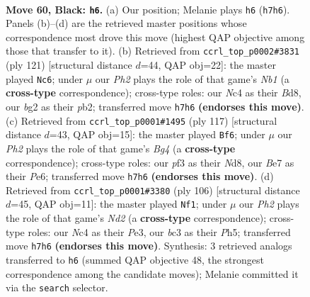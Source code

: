 \documentclass[11pt]{article}
\begin{document}
\clearpage

\begin{figure}[p]\centering
\begin{subfigure}{0.46\textwidth}\centering
\resizebox{\linewidth}{!}{%
\newchessgame
\chessboard[
  setfen={3r4/4b2p/p2p2k1/4p2p/2n1P3/2B2P2/4K1B1/7R b - - 1 60},
  showmover=false,
  pgfstyle=straightmove, color=movearrow, markmove={h7-h6}
]}
\caption{}
\end{subfigure}\hfill
\begin{subfigure}{0.46\textwidth}\centering
\resizebox{\linewidth}{!}{%
\newchessgame
\chessboard[
  setfen={1n1b4/p2r1kp1/5pp1/8/2N3PP/2B5/1P2KP2/R7 b - - 20 61},
  showmover=false,
  pgfstyle=straightmove, color=movearrow, markmove={b8-c6}
]}
\caption{}
\end{subfigure}
\\[4pt]
\begin{subfigure}{0.46\textwidth}\centering
\resizebox{\linewidth}{!}{%
\newchessgame
\chessboard[
  setfen={2kn4/1p5R/4p1r1/1p3pb1/1P1P4/P4B2/1B3P2/5K2 b - - 2 59},
  showmover=false,
  pgfstyle=straightmove, color=movearrow, markmove={g5-f6}
]}
\caption{}
\end{subfigure}\hfill
\begin{subfigure}{0.46\textwidth}\centering
\resizebox{\linewidth}{!}{%
\newchessgame
\chessboard[
  setfen={1r3k2/2b2pp1/7p/7P/6P1/1P2P3/2BN1PK1/8 w - - 3 54},
  showmover=false,
  pgfstyle=straightmove, color=movearrow, markmove={d2-f1}
]}
\caption{}
\end{subfigure}
\caption{\textbf{Move 60, Black: \texttt{h6}.} (a) Our position; Melanie plays \texttt{h6} (\texttt{h7h6}). Panels (b)--(d) are the retrieved master positions whose correspondence most drove this move (highest QAP objective among those that transfer to it). (b) Retrieved from \texttt{ccrl\_top\_p0002\#3831} (ply 121) [structural distance $d$=44, QAP obj=22]: the master played \texttt{Nc6}; under $\mu$ our \emph{Ph2} plays the role of that game's \emph{Nb1} (a \textbf{cross-type} correspondence); cross-type roles: our \emph{N}c4 as their \emph{B}d8, our \emph{b}g2 as their \emph{p}b2; transferred move \texttt{h7h6} \textbf{(endorses this move)}. (c) Retrieved from \texttt{ccrl\_top\_p0001\#1495} (ply 117) [structural distance $d$=43, QAP obj=15]: the master played \texttt{Bf6}; under $\mu$ our \emph{Ph2} plays the role of that game's \emph{Bg4} (a \textbf{cross-type} correspondence); cross-type roles: our \emph{p}f3 as their \emph{N}d8, our \emph{B}e7 as their \emph{P}e6; transferred move \texttt{h7h6} \textbf{(endorses this move)}. (d) Retrieved from \texttt{ccrl\_top\_p0001\#3380} (ply 106) [structural distance $d$=45, QAP obj=11]: the master played \texttt{Nf1}; under $\mu$ our \emph{Ph2} plays the role of that game's \emph{Nd2} (a \textbf{cross-type} correspondence); cross-type roles: our \emph{N}c4 as their \emph{P}e3, our \emph{b}c3 as their \emph{P}h5; transferred move \texttt{h7h6} \textbf{(endorses this move)}. Synthesis: 3 retrieved analogs transferred to \texttt{h6} (summed QAP objective 48, the strongest correspondence among the candidate moves); Melanie committed it via the \texttt{search} selector.}
\label{fig:thought-m119}
\end{figure}
\end{document}
